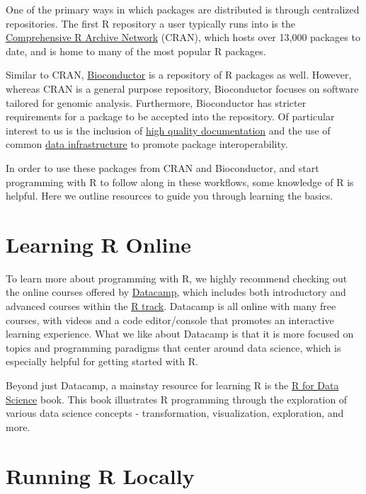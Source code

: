 \documentclass[]{book}
\begin{document}
One of the primary ways in which packages are distributed is through centralized repositories. The first R repository a user typically runs into is the \href{https://cran.r-project.org/mirrors.html}{Comprehensive R Archive Network} (CRAN), which hosts over 13,000 packages to date, and is home to many of the most popular R packages.

Similar to CRAN, \href{https://bioconductor.org}{Bioconductor} is a repository of R packages as well. However, whereas CRAN is a general purpose repository, Bioconductor focuses on software tailored for genomic analysis. Furthermore, Bioconductor has stricter requirements for a package to be accepted into the repository. Of particular interest to us is the inclusion of \protect\hyperlink{learning-more}{high quality documentation} and the use of common \protect\hyperlink{data-infrastructure}{data infrastructure} to promote package interoperability.

In order to use these packages from CRAN and Bioconductor, and start programming with R to follow along in these workflows, some knowledge of R is helpful. Here we outline resources to guide you through learning the basics.

\hypertarget{getting-started-with-r}{%
\section{Learning R Online}\label{getting-started-with-r}}

To learn more about programming with R, we highly recommend checking out the online courses offered by \href{https://www.datacamp.com/}{Datacamp}, which includes both introductory and advanced courses within the \href{https://www.datacamp.com/courses/tech:r}{R track}. Datacamp is all online with many free courses, with videos and a code editor/console that promotes an interactive learning experience. What we like about Datacamp is that it is more focused on topics and programming paradigms that center around data science, which is especially helpful for getting started with R.

Beyond just Datacamp, a mainstay resource for learning R is the \href{https://r4ds.had.co.nz/}{R for Data Science} book. This book illustrates R programming through the exploration of various data science concepts - transformation, visualization, exploration, and more.

\hypertarget{running-r-locally}{%
\section{Running R Locally}\label{running-r-locally}}
\end{document}
